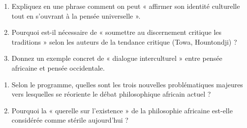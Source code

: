 \documentclass[11pt]{article}
\begin{document}
\begin{exercice}
\begin{enumerate}
    \item Expliquez en une phrase comment on peut « affirmer son identité culturelle tout en s'ouvrant à la pensée universelle ».
    \item Pourquoi est-il nécessaire de « soumettre au discernement critique les traditions » selon les auteurs de la tendance critique (Towa, Hountondji) ?
    \item Donnez un exemple concret de « dialogue interculturel » entre pensée africaine et pensée occidentale.
\end{enumerate}
\end{exercice}

\begin{exercice}
\begin{enumerate}
    \item Selon le programme, quelles sont les trois nouvelles problématiques majeures vers lesquelles se réoriente le débat philosophique africain actuel ?
    \item Pourquoi la « querelle sur l'existence » de la philosophie africaine est-elle considérée comme stérile aujourd'hui ?
\end{enumerate}
\end{exercice}
\end{document}
